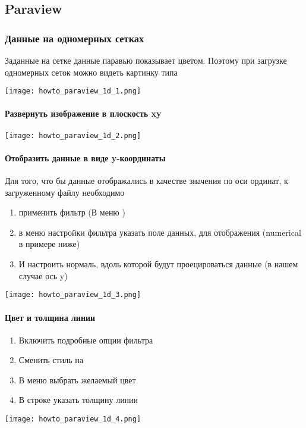 \subsection{Paraview}
\label{sec:paraview}

\subsubsection{Данные на одномерных сетках}
\label{sec:paraview-1d}

Заданные на сетке данные паравью показывает цветом.
Поэтому при загрузке одномерных сеток можно видеть картинку типа
\begin{center}
\texttt{[image: howto\_paraview\_1d\_1.png]}
\end{center}
\paragraph{Развернуть изображение в плоскость xy}
\begin{center}
\texttt{[image: howto\_paraview\_1d\_2.png]}
\end{center}
\paragraph{Отобразить данные в виде y-координаты} Для того, что бы данные отображались в качестве значения по оси ординат, к загруженному файлу необходимо
\begin{enumerate}
\item применить фильтр  (В меню )
\item в меню настройки фильтра указать поле данных, для отображения (numerical в примере ниже)
\item И настроить нормаль, вдоль которой будут проецироваться данные (в нашем случае ось y)
\end{enumerate}
\begin{center}
\texttt{[image: howto\_paraview\_1d\_3.png]}
\end{center}

\paragraph{Цвет и толщина линии}
\begin{enumerate}
\item Включить подробные опции фильтра
\item Сменить стиль на 
\item В меню  выбрать желаемый цвет
\item В строке  указать толщину линии
\end{enumerate}
\begin{center}
\texttt{[image: howto\_paraview\_1d\_4.png]}
\end{center}

